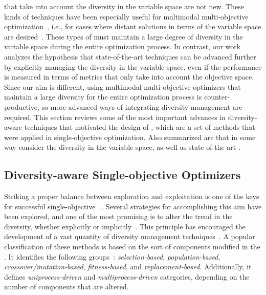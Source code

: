 \MOEAS{} that take into account the diversity in the variable space are not new.
%
These kinds of techniques have been especially useful for multimodal multi-objective optimization~\cite{Liang:16},
i.e., for cases where distant solutions in terms of the variable space are desired~\cite{deb2008omni, cuate2019variation}.
%
These types of \MOEAS{} must maintain a large degree of diversity in the variable space during the entire optimization process.
%
In contrast, our work analyzes the hypothesis that state-of-the-art techniques can be advanced further by explicitly managing
the diversity in the variable space, even if the performance is measured in terms of metrics that only take into account 
the objective space.
%
Since our aim is different, using multimodal multi-objective optimizers that maintain a large diversity 
for the entire optimization process is counter-productive, 
so more advanced ways of integrating diversity management are required.
%
This section reviews some of the most important advances in diversity-aware techniques that motivated the
design of \AVSDMOEAD{}, which are a set of methods that were applied in single-objective optimization.
%
Also summarized are \MOEAS{} that in some way consider the diversity in the variable space, as well as
state-of-the-art \MOEAS{}.

\subsection{Diversity-aware Single-objective Optimizers}

Striking a proper balance between exploration and exploitation is one of the keys for successful single-objective
\EAS{}~\cite{lin2009auto}.
%
Several strategies for accomplishing this aim have been explored, and one of the most promising is to alter the trend
in the diversity, whether explicitly or implicitly~\cite{Joel:Crepinsek}.
%
This principle has encouraged the development of a vast quantity of diversity management techniques~\cite{pandey2014comparative}.
%
A popular classification of these methods is based on the sort of components modified in the \EA{}.
%
It identifies the following groups~\cite{Joel:Crepinsek}: \textit{selection-based}, \textit{population-based}, \textit{crossover/mutation-based}, \textit{fitness-based}, and \textit{replacement-based}.
%
Additionally, it defines \textit{uniprocess-driven} and \textit{multiprocess-driven} categories, depending on the number
of components that are altered.

